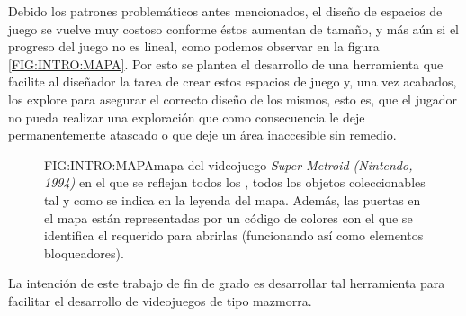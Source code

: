 Debido los patrones problemáticos antes mencionados, el diseño de espacios de juego se vuelve muy costoso conforme éstos aumentan de tamaño, y más aún si el progreso del juego no es lineal, como podemos observar en la figura \ref{FIG:INTRO:MAPA}. Por esto se plantea el desarrollo de una herramienta que facilite al diseñador la tarea de crear estos espacios de juego y, una vez acabados, los explore para asegurar el correcto diseño de los mismos, esto es, que el jugador no pueda realizar una exploración que como consecuencia le deje permanentemente atascado o que deje un área inaccesible sin remedio.

\begin{figure}{FIG:INTRO:MAPA}{mapa del videojuego \textit{Super Metroid\cite{supermetroid} (Nintendo, 1994)} en el que se reflejan todos los , todos los objetos coleccionables tal y como se indica en la leyenda del mapa. Además, las puertas en el mapa están representadas por un código de colores con el que se identifica el  requerido para abrirlas (funcionando así como elementos bloqueadores).}
\end{figure}

La intención de este trabajo de fin de grado es desarrollar tal herramienta para facilitar el desarrollo de videojuegos de tipo mazmorra.